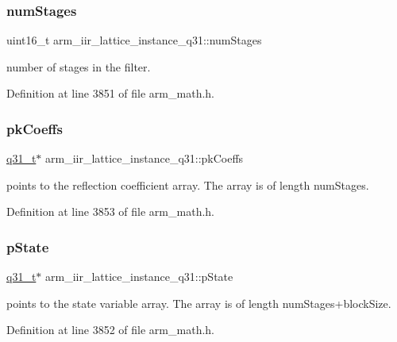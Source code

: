 \subsubsection{\texorpdfstring{num\+Stages}{numStages}}
{\footnotesize\ttfamily uint16\+\_\+t arm\+\_\+iir\+\_\+lattice\+\_\+instance\+\_\+q31\+::num\+Stages}

number of stages in the filter. 

Definition at line 3851 of file arm\+\_\+math.\+h.

\mbox{\label{structarm__iir__lattice__instance__q31_a1d30aa16aac7722936ea9dee59211863}} 
\subsubsection{\texorpdfstring{pk\+Coeffs}{pkCoeffs}}
{\footnotesize\ttfamily \hyperlink{arm__math_8h_adc89a3547f5324b7b3b95adec3806bc0}{q31\+\_\+t}$\ast$ arm\+\_\+iir\+\_\+lattice\+\_\+instance\+\_\+q31\+::pk\+Coeffs}

points to the reflection coefficient array. The array is of length num\+Stages. 

Definition at line 3853 of file arm\+\_\+math.\+h.

\mbox{\label{structarm__iir__lattice__instance__q31_a941282745effd26a889fbfadf4b95e6a}} 
\subsubsection{\texorpdfstring{p\+State}{pState}}
{\footnotesize\ttfamily \hyperlink{arm__math_8h_adc89a3547f5324b7b3b95adec3806bc0}{q31\+\_\+t}$\ast$ arm\+\_\+iir\+\_\+lattice\+\_\+instance\+\_\+q31\+::p\+State}

points to the state variable array. The array is of length num\+Stages+block\+Size. 

Definition at line 3852 of file arm\+\_\+math.\+h.

